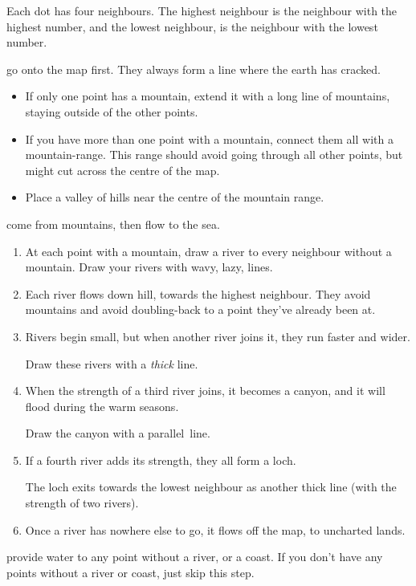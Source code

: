 \begin{multicols}{2}
Each dot has four neighbours.
The highest neighbour is the neighbour with the highest number, and the lowest neighbour, is the neighbour with the lowest number.

go onto the map first.
They always form a line where the earth has cracked.

\begin{itemize}
  \item
  If only one point has a mountain, extend it with a long line of mountains, staying outside of the other points.
  \item
  If you have more than one point with a mountain, connect them all with a mountain-range.
  This range should avoid going through all other points, but might cut across the centre of the map.
  \item
  Place a valley of hills near the centre of the mountain range.
\end{itemize}

\label{mapRivers}
come from mountains, then flow to the sea.

\begin{enumerate}
  \item
  At each point with a mountain, draw a river to every neighbour without a mountain.
  Draw your rivers with wavy, lazy, lines.
  \item
  Each river flows down hill, towards the highest neighbour.
  They avoid mountains and avoid doubling-back to a point they've already been at.
  \item
  Rivers begin small, but when another river joins it, they run faster and wider.

  Draw these rivers with a \emph{thick} line.
  \item
  When the strength of a third river joins, it becomes a canyon, and it will flood during the warm seasons.

  Draw the canyon with a parallel~line.
  \item
  If a fourth river adds its strength, they all form a loch.
  
  The loch exits towards the lowest neighbour as another thick line (with the strength of two rivers).
  \item
  Once a river has nowhere else to go, it flows off the map, to uncharted lands.
\end{enumerate}

provide water to any point without a river, or a coast.
If you don't have any points without a river or coast, just skip this step.


\end{multicols}
